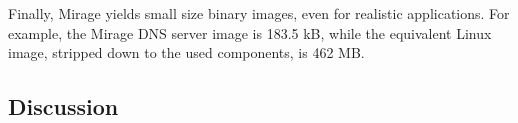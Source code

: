 Finally, Mirage yields small size binary images, even for realistic applications.
For example, the Mirage DNS server image is 183.5 kB, while the equivalent Linux image, stripped down to the used components, is 462 MB.


\subsection{Discussion}


